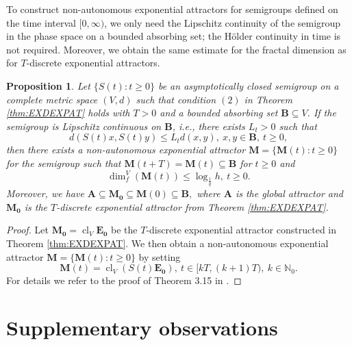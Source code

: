 \documentclass[a4paper,12pt,reqno]{amsart}
\theoremstyle{plain}
\newtheorem{prop}[lem]{Proposition}
\theoremstyle{definition}
\numberwithin{equation}{section}
\newcommand{\N}{\mathbb{N}}
\newcommand{\dimf}{\operatorname{dim}_{f}}
\newcommand{\cl}{\operatorname{cl}}
\renewcommand{\geq}{\geqslant}
\renewcommand{\leq}{\leqslant}
\begin{document}
To construct  non-autonomous exponential attractors for semigroups defined on the time interval $[0,\infty)$, we only need the Lipschitz continuity of the semigroup in the phase space on a bounded absorbing set; the H\"older continuity in time is not required. Moreover, we obtain the same estimate for the fractal dimension as for $T$-discrete exponential attractors.

\begin{prop}
Let $\{S(t)\colon t\geq 0\}$ be an asymptotically closed semigroup on a complete metric space $(V,d)$ such that condition $(2)$ in Theorem \ref{thm:EXDEXPAT} holds with $T>0$ and a bounded absorbing set $\mathbf{B}\subseteq V$.
If the semigroup is Lipschitz continuous on $\mathbf{B}$, i.e., there exists $L_t>0$ such that 
$$d(S(t)x,S(t)y)\leq L_t d(x,y),\ x,y\in \mathbf{B},\ t\geq 0,$$
then there exists a non-autonomous exponential attractor  $\mathbf{M}= \{\mathbf{M}(t)\colon t\geq 0\}$ for the semigroup 
such that $\mathbf{M}(t+T)=\mathbf{M}(t)\subseteq\mathbf{B}$ for $t\geq 0$
and 
$$\dimf^{V}(\mathbf{M}(t))\leq\log_{\frac{1}{q}}h,\ t\geq 0.$$
Moreover, we have $\mathbf{A}\subseteq\mathbf{M_0}\subseteq\mathbf{M}(0)\subseteq\mathbf{B},$ where $\mathbf{A}$ is the global attractor and $\mathbf{M_0}$ is the $T$-discrete exponential attractor from Theorem \ref{thm:EXDEXPAT}.
\end{prop}

\begin{proof}
Let $\mathbf{M_0}=\cl_{V}\mathbf{E_0}$ be the $T$-discrete exponential attractor constructed in Theorem \ref{thm:EXDEXPAT}. We then obtain a non-autonomous exponential attractor  $\mathbf{M}= \{\mathbf{M}(t)\colon t\geq 0\}$ by setting
$$\mathbf{M}(t)=\cl_{V}(S(t)\mathbf{E_0}),\ t\in [kT,(k+1)T),\ k\in \N_0.$$
For details we refer to the proof of Theorem 3.15 in \cite{sonner2012}.
\end{proof}

\section{Supplementary observations}\label{sec:FC}
\end{document}
